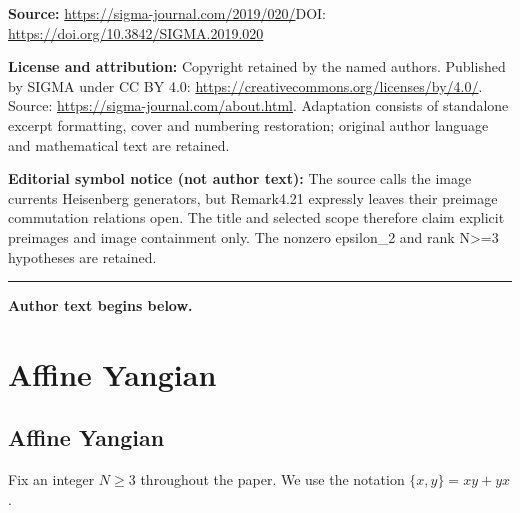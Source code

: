 \documentclass[11pt]{article}
\theoremstyle{definition}
\numberwithin{equation}{section}
\begin{document}
\noindent\textbf{Source:} \url{https://sigma-journal.com/2019/020/}\quad DOI: \url{https://doi.org/10.3842/SIGMA.2019.020}\par
\noindent\textbf{License and attribution:} Copyright retained by the named authors. Published by SIGMA under CC BY 4.0: \url{https://creativecommons.org/licenses/by/4.0/}. Source: \url{https://sigma-journal.com/about.html}. Adaptation consists of standalone excerpt formatting, cover and numbering restoration; original author language and mathematical text are retained.\par
\noindent\textbf{Editorial symbol notice (not author text):} The source calls the image currents Heisenberg generators, but Remark4.21 expressly leaves their preimage commutation relations open. The title and selected scope therefore claim explicit preimages and image containment only. The nonzero epsilon\_2 and rank N>=3 hypotheses are retained.\par
\medskip\hrule\medskip\noindent\textbf{Author text begins below.}\par
\setcounter{section}{1}
\setcounter{subsection}{0}
\setcounter{subsubsection}{0}
\setcounter{thm}{0}
\setcounter{equation}{0}
\section{Affine Yangian}\label{sec:affine_Yangian}

\subsection{Affine Yangian}

Fix an integer $N \geq 3$ throughout the paper. We use the notation $\{x,y\}=xy+yx$.
\end{document}
